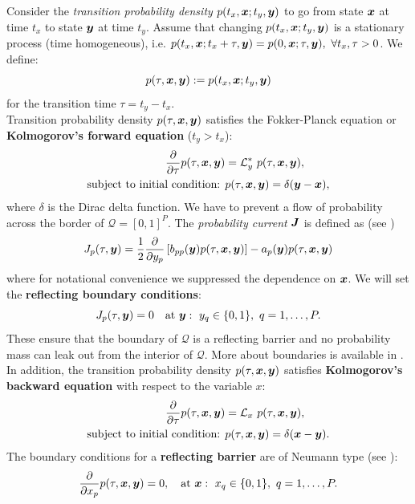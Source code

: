 \documentclass{article}
\def\x{\mbox{\boldmath $x$}}
\def\y{\mbox{\boldmath $y$}}
\def\J{\mbox{\boldmath $J$}}
\def\calL{{\mathcal L}}
\def\calQ{{\mathcal Q}}
\begin{document}
Consider the \textit{transition probability density} $p(t_x,\x; t_y,\y)$ to go from state $\x$ at time $t_x$ to state $\y$ at time $t_y$.
Assume that changing $p(t_x,\x; t_y,\y)$ is a stationary process (time homogeneous), i.e. $p(t_x, \x; t_x + \tau, \y) = p(0, \x; \tau, \y),\ \forall t_x, \tau > 0$.
We define:
$$p(\tau, \x, \y) := p(t_x, \x; t_y, \y)$$
for the transition time $\tau = t_y - t_x$.\\

Transition probability density $p(\tau, \x, \y)$ satisfies the Fokker-Planck equation or \textbf{Kolmogorov's forward equation} ($t_y > t_x$):
\begin{equation} \label{KFE}
\begin{split}
\frac{\partial}{\partial \tau}p(\tau, \x, \y) &=  \calL_y^* \ p(\tau, \x, \y), \\
\text{subject to initial condition: } & p(\tau, \x, \y) = \delta(\y - \x),
\end{split}
\end{equation}
where $\delta$ is the Dirac delta function.
We have to prevent a flow of probability across the border of $\calQ = [0,1]^P$.
The \textit{probability current} $\J$ is defined as (see \citet[ch. 5.2.1]{gardiner1985})
\begin{equation*}
J_p(\tau,\y) = \frac{1}{2}\frac{\partial}{\partial y_p} \left[b_{pp}(\y)p(\tau, \x, \y)\right] - a_p(\y) p(\tau, \x, \y)
\end{equation*}
where for notational convenience we suppressed the dependence on $\x$.
We will set the \textbf{reflecting boundary conditions}:
\begin{equation*}
J_p(\tau,\y) = 0 \quad \text{at } \y:\ y_q \in \{0, 1\}, \ q=1,\ldots, P.
\end{equation*}
These ensure that the boundary of $\calQ$ is a reflecting barrier and no probability mass can leak out from the interior of $\calQ$.
More about boundaries is available in \citet[ch. 5.2.1]{gardiner1985}.\\

In addition, the transition probability density $p(\tau, \x, \y)$ satisfies \textbf{Kolmogorov's backward equation} with respect to the variable $x$:
\begin{equation} \label{KBE}
\begin{split}
\frac{\partial}{\partial \tau}p(\tau, \x, \y) &=  \calL_x \ p(\tau, \x, \y),\\
\text{subject to initial condition: } & p(\tau, \x, \y) = \delta(\x - \y).
\end{split}
\end{equation}
The boundary conditions for a\textbf{ reflecting barrier} are of Neumann type (see \citet[ch. 5.2.1]{gardiner1985}):
\begin{equation*}
\frac{\partial}{\partial x_p}p(\tau, \x, \y) = 0, \quad \text{at } \x:\ x_q \in \{0, 1\}, \ q=1,\ldots, P.
\end{equation*}
\end{document}
